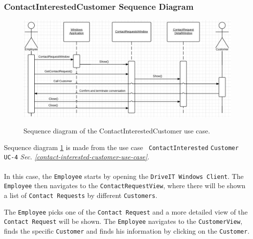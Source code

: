 \subsubsection{ContactInterestedCustomer Sequence Diagram}
\begin{figure}[H]
	\centering
		\includegraphics[width=\textwidth]{Figures/SequenceDiagram-ContactInterestedCustomer}\\
	\caption{Sequence diagram of the ContactInterestedCustomer use case.}
  \label{fig:SequenceDiagram-ContactInterestedCustomer}
\end{figure}

Sequence diagram \ref{fig:SequenceDiagram-ContactInterestedCustomer} is made from the use case \texttt{ ContactInterested} \texttt{Customer UC-4} \textit{Sec. \ref{contact-interested-customer-use-case}}. \\\\
In this case, the \texttt{Employee} starts by opening the \texttt{DriveIT Windows Client}. The \texttt{Employee} then navigates to the \texttt{ContactRequestView}, where there will be shown a list of \texttt{Contact Requests} by different \texttt{Customers}. 

The \texttt{Employee} picks one of the \texttt{Contact Request} and a more detailed view of the \texttt{Contact Request} will be shown. The \texttt{Employee} navigates to the \texttt{CustomerView}, finds the specific \texttt{Customer} and finds his information by clicking on the \texttt{Customer}.

